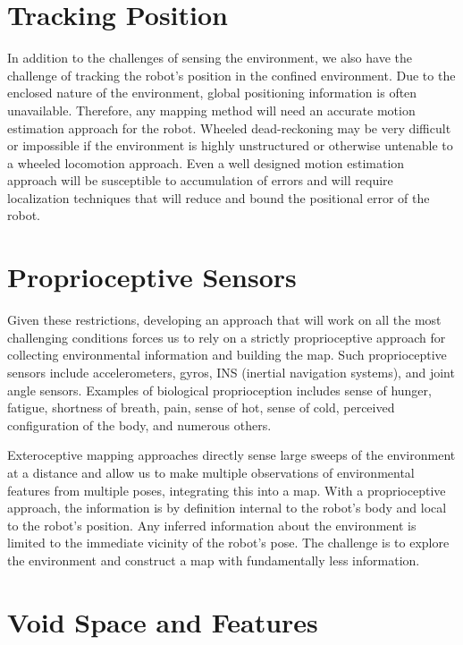 \section{Tracking Position}
\label{trackingposition}

In addition to the challenges of sensing the environment, we also have the challenge of tracking the robot’s position in the confined environment. Due to the enclosed nature of the environment, global positioning information is often unavailable. Therefore, any mapping method will need an accurate motion estimation approach for the robot. Wheeled dead-reckoning may be very difficult or impossible if the environment is highly unstructured or otherwise untenable to a wheeled locomotion approach. Even a well designed motion estimation approach will be susceptible to accumulation of errors and will require localization techniques that will reduce and bound the positional error of the robot.

\section{Proprioceptive Sensors}
\label{proprioceptivesensors}

Given these restrictions, developing an approach that will work on all the most challenging conditions forces us to rely on a strictly proprioceptive approach for collecting environmental information and building the map. Such proprioceptive sensors include accelerometers, gyros, INS (inertial navigation systems), and joint angle sensors. Examples of biological proprioception includes sense of hunger, fatigue, shortness of breath, pain, sense of hot, sense of cold, perceived configuration of the body, and numerous others.

Exteroceptive mapping approaches directly sense large sweeps of the environment at a distance and allow us to make multiple observations of environmental features from multiple poses, integrating this into a map. With a proprioceptive approach, the information is by definition internal to the robot’s body and local to the robot’s position. Any inferred information about the environment is limited to the immediate vicinity of the robot’s pose. The challenge is to explore the environment and construct a map with fundamentally less information.

\section{Void Space and Features}
\label{voidspaceandfeatures}

